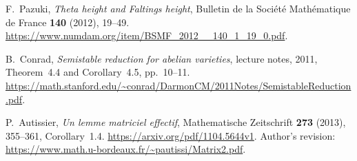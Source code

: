 F.~Pazuki,
\emph{Theta height and Faltings height},
Bulletin de la Soci\'et\'e Math\'ematique de France
\textbf{140} (2012), 19--49.
\url{https://www.numdam.org/item/BSMF_2012__140_1_19_0.pdf}.

B.~Conrad,
\emph{Semistable reduction for abelian varieties},
lecture notes, 2011, Theorem~4.4 and Corollary~4.5, pp.~10--11.
\url{https://math.stanford.edu/~conrad/DarmonCM/2011Notes/SemistableReduction.pdf}.

P.~Autissier,
\emph{Un lemme matriciel effectif},
Mathematische Zeitschrift \textbf{273} (2013), 355--361,
Corollary~1.4.
\url{https://arxiv.org/pdf/1104.5644v1}.
Author's revision:
\url{https://www.math.u-bordeaux.fr/~pautissi/Matrix2.pdf}.
